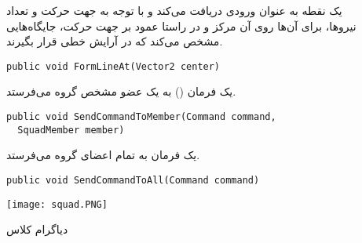 \begin{description}
  \item[]
  یک نقطه به عنوان ورودی دریافت می‌کند و با توجه به جهت حرکت و تعداد نیروها، برای آن‌ها روی آن مرکز و
  در راستا عمود بر جهت حرکت، جایگاه‌هایی مشخص می‌کند که در آرایش خطی قرار بگیرند.
\begin{latin}
{\linespread{1.2}
{\inconsolata
\lstset{language=Java}
\begin{lstlisting}
public void FormLineAt(Vector2 center)
\end{lstlisting}
}
}
\end{latin}
  \item[]
  یک فرمان () به یک عضو مشخص گروه می‌فرستد.
\begin{latin}
{\linespread{1.2}
{\inconsolata
\lstset{language=Java}
\begin{lstlisting}
public void SendCommandToMember(Command command,
  SquadMember member)
\end{lstlisting}
}
}
\end{latin}

  \item[]
  یک فرمان به تمام اعضای گروه می‌فرستد.
\begin{latin}
{\linespread{1.2}
{\inconsolata
\lstset{language=Java}
\begin{lstlisting}
public void SendCommandToAll(Command command)
\end{lstlisting}
}
}
\end{latin}

\end{description}

\begin{figure}
  \begin{center}
    \texttt{[image: squad.PNG]}
    \caption{دیاگرام کلاس 
    \label{fig4-2}}
 \end{center}
\end{figure}

\newpage
